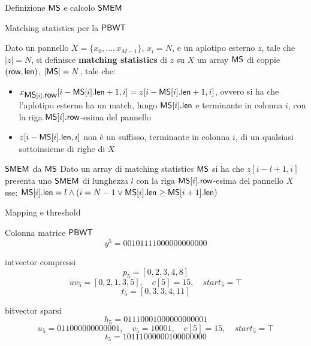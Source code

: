 \documentclass[]{beamer}
\def\len{\mbox{\rm {\sf len}}}
\def\row{\mbox{\rm {\sf row}}}
\def\MS{\mbox{\rm {\sf MS}}}
\def\PBWT{\mbox{\rm {\sf PBWT}}}
\def\SMEM{\mbox{\rm {\sf SMEM}}}
\begin{document}
\begin{frame}[plain]{Definizione $\MS$ e calcolo $\SMEM$}
  \begin{block}{Matching statistics per la $\PBWT$}
    {\small{
        Dato un pannello $X=\{x_0,\ldots,x_{M-1}\}$, $x_i=N$,
        e un aplotipo esterno $z$, tale che $|z|=N$, si definisce
        \textbf{matching
        statistics} di $z$ su $X$ un array $\MS$ di coppie $(\row,\len)$, 
        $|\MS|=N$, tale che:   
        \begin{itemize}
          \item $x_{\MS[i].\row}[i-\MS[i].\len+1,i]=z[i-\MS[i].\len+1,i]$, ovvero si
          ha che 
          l'aplotipo esterno ha un match, lungo $\MS[i].\len$ e terminante in colonna
          $i$, con la riga 
          $\MS[i].\row$-esima del pannello
          \item $z[i-\MS[i].\len,i]$ non è un suffisso,
          terminante in 
          colonna $i$,
          di un qualsiasi sottoinsieme di righe di $X$
        \end{itemize}
      }}
  \end{block}
  \begin{block}{$\SMEM$ da $\MS$}
    {\small{
        Dato un array di matching statistics $\MS$ si ha che $z[i-l+1,i]$
        presenta uno $\SMEM$ di lunghezza $l$ con la riga $\MS[i].\row$-esima
        del 
        pannello $X$ sse: 
        $\MS[i].\len=l\land(i=N-1\lor \MS[i].\len\geq \MS[i+1].\len)$
      }}
  \end{block}
\end{frame}
\begin{frame}[plain]{Mapping e threshold}
  \begin{block}{Colonna matrice $\PBWT$}
    \[y^5=00101111000000000000\]
  \end{block}
  \begin{block}{intvector compressi}
    \[p_5=[0,2,3,4,8]\]
    \[uv_5=[0,2,1,3,5],\quad c[5]=15,\quad start_5=\top\]
    \[t_5=[0,3,3,4,11]\]
  \end{block}
  \begin{block}{bitvector sparsi}
    \[h_5=01110001000000000001\]
    \[u_5=011000000000001,\quad v_5=10001,\quad c[5]=15,\quad start_5=\top\]
    \[t_5=10111000000100000000\]
  \end{block}
\end{frame}
\end{document}
